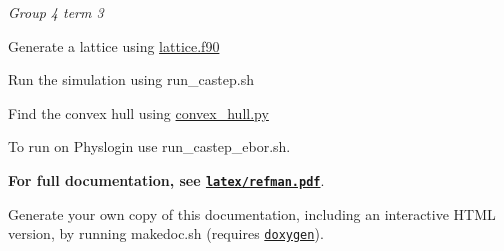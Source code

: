 {\itshape Group 4 term 3}


\begin{DoxyEnumerate}
\item Generate a lattice using {\ttfamily \hyperlink{lattice_8f90}{lattice.\+f90}}
\item Run the simulation using {\ttfamily run\+\_\+castep.\+sh}
\item Find the convex hull using {\ttfamily \hyperlink{convex__hull_8py}{convex\+\_\+hull.\+py}}
\end{DoxyEnumerate}

To run on Physlogin use {\ttfamily run\+\_\+castep\+\_\+ebor.\+sh}.

{\bfseries For full documentation, see \href{https://github.com/mges501York/Group-4-Term-3/blob/master/latex/refman.pdf}{\tt latex/refman.\+pdf}}.

Generate your own copy of this documentation, including an interactive H\+T\+ML version, by running {\ttfamily makedoc.\+sh} (requires \href{http://www.stack.nl/~dimitri/doxygen/}{\tt doxygen}). 